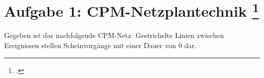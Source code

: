 \documentclass{lehramt-informatik-aufgabe}
\begin{document}
\section{Aufgabe 1: CPM-Netzplantechnik
\footcite[Seite 1]{sosy:ab:5}
}

Gegeben ist das nachfolgende CPM-Netz. Gestrichelte Linien zwischen
Ereignissen stellen Scheinvorgänge mit einer Dauer von $0$ dar.

\begin{center}
\end{center}
\end{document}

